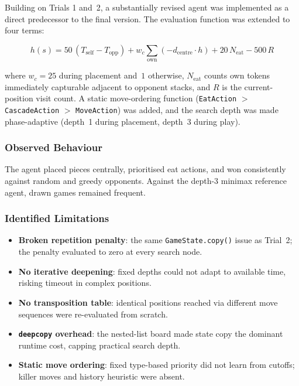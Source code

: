 \documentclass[10pt,a4paper]{article}
\begin{document}
Building on Trials 1 and~2, a substantially revised agent was implemented as a direct predecessor to the final version. The evaluation function was extended to four terms:

\begin{equation}
h(s) = 50\,(T_{\text{self}} - T_{\text{opp}}) + w_c \sum_{\text{own}} (-d_{\text{centre}} \cdot h) + 20\,N_{\text{eat}} - 500\,R
\end{equation}

where $w_c = 25$ during placement and~$1$ otherwise, $N_{\text{eat}}$ counts own tokens immediately capturable adjacent to opponent stacks, and $R$ is the current-position visit count. A static move-ordering function (\texttt{EatAction} $>$ \texttt{CascadeAction} $>$ \texttt{MoveAction}) was added, and the search depth was made phase-adaptive (depth~1 during placement, depth~3 during play).

\subsubsection{Observed Behaviour}

The agent placed pieces centrally, prioritised eat actions, and won consistently against random and greedy opponents. Against the depth-3 minimax reference agent, drawn games remained frequent.

\subsubsection{Identified Limitations}

\begin{itemize}[noitemsep]
    \item \textbf{Broken repetition penalty}: the same \texttt{GameState.copy()} issue as Trial~2; the penalty evaluated to zero at every search node.
    \item \textbf{No iterative deepening}: fixed depths could not adapt to available time, risking timeout in complex positions.
    \item \textbf{No transposition table}: identical positions reached via different move sequences were re-evaluated from scratch.
    \item \textbf{\texttt{deepcopy} overhead}: the nested-list board made state copy the dominant runtime cost, capping practical search depth.
    \item \textbf{Static move ordering}: fixed type-based priority did not learn from cutoffs; killer moves and history heuristic were absent.
\end{itemize}
\end{document}
